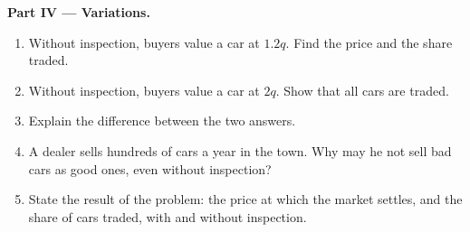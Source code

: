\begin{problem}
\medskip
\noindent\textbf{Part IV --- Variations.}
\begin{enumerate}[resume]
\item Without inspection, buyers value a car at $1.2q$. Find the price and the share traded.
\item Without inspection, buyers value a car at $2q$. Show that all cars are traded.
\item Explain the difference between the two answers.
\item A dealer sells hundreds of cars a year in the town. Why may he not sell bad cars as good ones, even without inspection?
\item State the result of the problem: the price at which the market settles, and the share of cars traded, with and without inspection.
\end{enumerate}
\end{problem}
